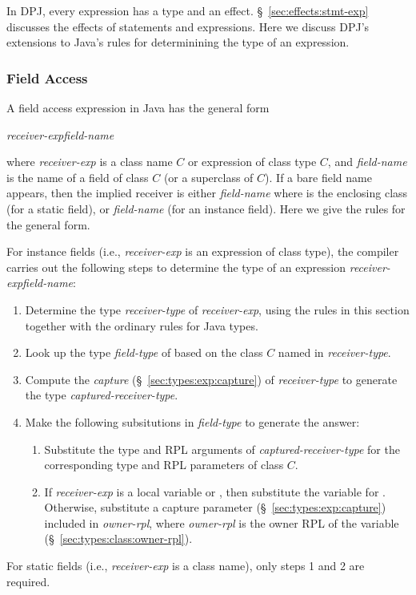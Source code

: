 In DPJ, every expression has a type and an effect.
\S~\ref{sec:effects:stmt-exp} discusses the effects of statements and
expressions.  Here we discuss DPJ's extensions to Java's rules for
determinining the type of an expression.

\subsubsection{Field Access%
\label{sec:types:exp:field}}

A field access expression in Java has the general form
%
\begin{description}
\item \emph{receiver-exp}\emph{field-name}
\end{description}
%
where \emph{receiver-exp} is a class name $C$ or expression of class
type $C$, and \emph{field-name} is the name of a field of class $C$
(or a superclass of $C$).  If a bare field name appears, then the
implied receiver is either \emph{field-name} where  is
the enclosing class (for a static field), or
\emph{field-name} (for an instance field).  Here we give
the rules for the general form.

For instance fields (i.e., \emph{receiver-exp} is an expression of
class type), the compiler carries out the following steps to determine
the type of an expression \emph{receiver-exp}\emph{field-name}:
%
\begin{enumerate}
%
\item Determine the type \emph{receiver-type} of \emph{receiver-exp}, using the rules in
  this section together with the ordinary rules for Java types.
%
\item Look up the type \emph{field-type} of  based on the
  class $C$ named in \emph{receiver-type}.
%
\item Compute the \emph{capture} (\S~\ref{sec:types:exp:capture}) of
  \emph{receiver-type} to generate the type
  \emph{captured-receiver-type}.
%
\item Make the following subsitutions in \emph{field-type} to generate
  the answer:
%
\begin{enumerate}
%
\item Substitute the type and RPL arguments of
  \emph{captured-receiver-type} for the corresponding type and RPL
  parameters of class $C$.
%
\item If \emph{receiver-exp} is a  local variable or
  , then substitute the variable for .  Otherwise,
  substitute a capture parameter (\S~\ref{sec:types:exp:capture})
  included in \emph{owner-rpl}\kwd{:*}, where \emph{owner-rpl} is the
  owner RPL of the variable (\S~\ref{sec:types:class:owner-rpl}).
%
\end{enumerate}
%
\end{enumerate}
%
For static fields (i.e., \emph{receiver-exp} is a class name), only
steps 1 and 2 are required.

